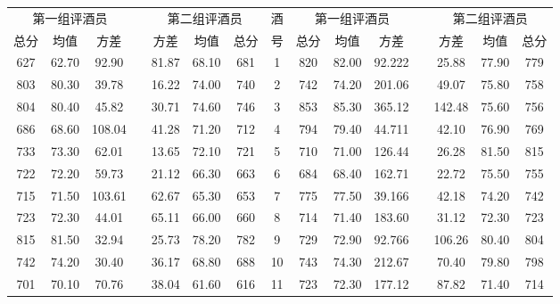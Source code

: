 \documentclass{cumcmart}
\begin{document}
    \begin{table}[!htbp]
    \centering
        \begin{tabular}{ccccccccccccccc}
        \toprule
        \multicolumn{3}{c}{第一组评酒员} &  & \multicolumn{3}{c}{第二组评酒员} & 酒 & \multicolumn{3}{c}{第一组评酒员} &  & \multicolumn{3}{c}{第二组评酒员} \\
        \cmidrule{1-3}  \cmidrule{5-7}   \cmidrule{9-11}  \cmidrule{13-15}
            总分    &    均值   &   方差   &  &  方差     &    均值   &  总分   & 号  & 总分    &    均值   &   方差   &  &  方差     &    均值   &  总分\\
        \midrule

            627  &  62.70  &  92.90   &  &  81.87  &  68.10  &  681  &  1   &  820  &   82.00  &  92.222   &   &  25.88   &   77.90   &   779   \\
            803  &  80.30  &  39.78   &  &  16.22  &  74.00  &  740  &  2   &  742  &   74.20  &  201.06   &   &  49.07   &   75.80   &   758   \\
            804  &  80.40  &  45.82   &  &  30.71  &  74.60  &  746  &  3   &  853  &   85.30  &  365.12   &   &  142.48  &   75.60   &   756   \\
            686  &  68.60  &  108.04  &  &  41.28  &  71.20  &  712  &  4   &  794  &   79.40  &  44.711   &   &  42.10   &   76.90   &   769   \\
            733  &  73.30  &  62.01   &  &  13.65  &  72.10  &  721  &  5   &  710  &   71.00  &  126.44   &   &  26.28   &   81.50   &   815   \\
            722  &  72.20  &  59.73   &  &  21.12  &  66.30  &  663  &  6   &  684  &   68.40  &  162.71   &   &  22.72   &   75.50   &   755   \\
            715  &  71.50  &  103.61  &  &  62.67  &  65.30  &  653  &  7   &  775  &   77.50  &  39.166   &   &  42.18   &   74.20   &   742   \\
            723  &  72.30  &  44.01   &  &  65.11  &  66.00  &  660  &  8   &  714  &   71.40  &  183.60   &   &  31.12   &   72.30   &   723   \\
            815  &  81.50  &  32.94   &  &  25.73  &  78.20  &  782  &  9   &  729  &   72.90  &  92.766   &   &  106.26  &   80.40   &   804   \\
            742  &  74.20  &  30.40   &  &  36.17  &  68.80  &  688  &  10  &  743  &   74.30  &  212.67   &   &  70.40   &   79.80   &   798   \\
            701  &  70.10  &  70.76   &  &  38.04  &  61.60  &  616  &  11  &  723  &   72.30  &  177.12   &   &  87.82   &   71.40   &   714   \\

\end{tabular}
\end{table}
\end{document}
